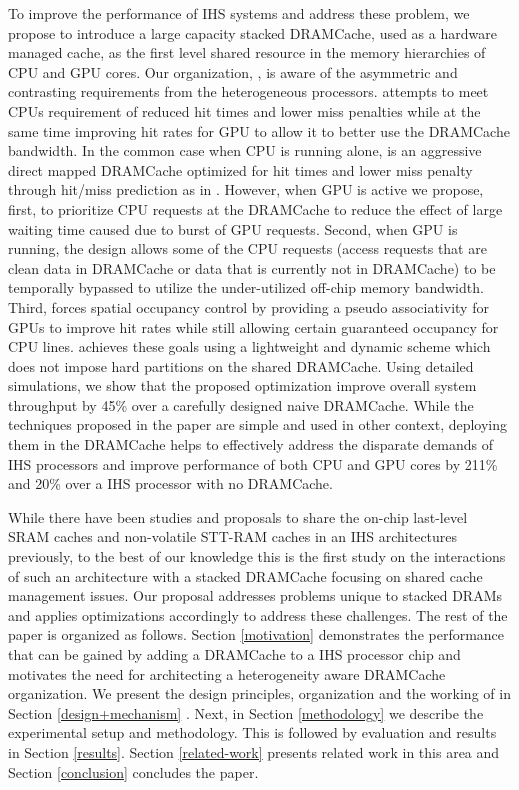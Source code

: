 To improve the performance of IHS systems and address these problem, we propose to introduce a large capacity stacked DRAMCache, used as a hardware managed cache, as the first level shared resource in the memory hierarchies of CPU and GPU cores. Our organization, \cachename, is aware of the asymmetric and contrasting requirements from the heterogeneous processors. \cachename attempts to meet CPUs requirement of reduced hit times and lower miss penalties while at the same time improving hit rates for GPU to allow it to better use the DRAMCache bandwidth. In the common case when CPU is running alone, \cachename is an aggressive direct mapped DRAMCache optimized for hit times and lower miss penalty through hit/miss prediction as in \cite{alloy}. However, when GPU is active we propose,  first, to prioritize CPU requests at the DRAMCache to reduce the effect of large waiting time caused due to burst of GPU requests. Second, when GPU is running, the \cachename design allows some of the CPU requests (access requests that are clean data in DRAMCache or data that is currently not in DRAMCache) to be temporally bypassed to utilize the under-utilized off-chip memory bandwidth. 
Third, \cachename forces spatial occupancy control by providing a pseudo associativity for GPUs to improve hit rates while still allowing certain guaranteed occupancy for CPU lines. \cachename achieves these goals using a lightweight and dynamic scheme which does not impose hard partitions on the shared DRAMCache. Using detailed simulations, we show that the proposed optimization improve overall system throughput by 45\% over a carefully designed naive DRAMCache.
While the techniques proposed in the paper are simple and used in other context, deploying them in the DRAMCache helps to effectively address the disparate demands of IHS processors and improve performance of both CPU and GPU cores by 211\% and 20\% over a IHS processor with no DRAMCache.

\par While there have been studies and proposals to share the on-chip last-level SRAM caches \cite{helm,tap} and non-volatile STT-RAM caches \cite{oscar} in an IHS architectures previously, to the best of our knowledge this is the first study on the interactions of such an architecture with a stacked DRAMCache focusing on shared cache management issues.
Our proposal \cachename addresses problems unique to stacked DRAMs and applies optimizations accordingly to address these challenges. The rest of the paper is organized as follows. Section \ref{motivation} demonstrates the performance that can be gained by adding a DRAMCache to a IHS processor chip and motivates the need for architecting a heterogeneity aware DRAMCache organization. We present the design principles, organization and the working of \cachename in Section \ref{design+mechanism} . Next, in Section \ref{methodology} we describe the experimental setup and methodology. This is followed by evaluation and results in Section \ref{results}. Section \ref{related-work} presents related work in this area and Section \ref{conclusion} concludes the paper.
